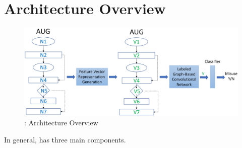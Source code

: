 \section{Architecture Overview}
\label{sec:overview}

\begin{figure}[t]
\begin{center}
\includegraphics[width=5.4in]{overview.png}
\vspace{-5pt}
\caption{{\tool}: Architecture Overview}
\label{overview}
\end{center}
\end{figure}

In general, {\tool} has three main components. 

